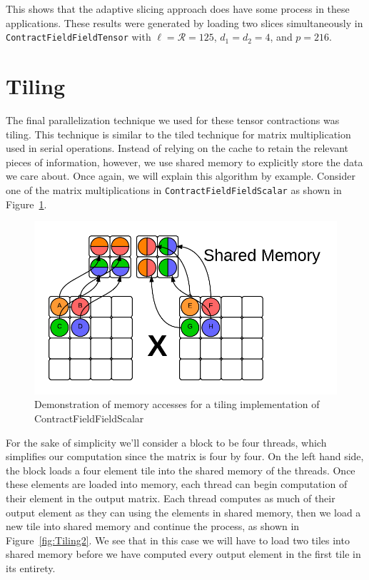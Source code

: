 This shows that the adaptive slicing approach does have some process in these applications. These results were generated by loading two slices simultaneously in \texttt{ContractFieldFieldTensor} with $\ell = \mathcal{R} = 125$, $d_1 = d_2 = 4$, and $p=216$.

\section{Tiling}\label{sec:tiling}

The final parallelization technique we used for these tensor contractions was
tiling. This technique is similar to the tiled technique for matrix
multiplication used in serial operations. Instead of relying on the cache to
retain the relevant pieces of information, however, we use shared memory to
explicitly store the data we care about. Once again, we will explain this
algorithm by example. Consider one of the matrix multiplications in
\texttt{ContractFieldFieldScalar} as shown in Figure~\ref{fig:Tiling}. 

\begin{figure}[ht]
    \centering
    \includegraphics[scale = .7]{ContractFieldFieldScalarGraphicTiling}
    \caption{Demonstration of memory accesses for a tiling implementation of ContractFieldFieldScalar}
\label{fig:Tiling}
\end{figure}

For the sake of simplicity we'll consider a block to be four threads, which
simplifies our computation since the matrix is four by four. On the left hand
side, the block loads a four element tile into the shared memory of the
threads. Once these elements are loaded into memory, each thread can begin
computation of their element in the output matrix. Each thread computes as much
of their output element as they can using the elements in shared memory, then
we load a new tile into shared memory and continue the process, as shown in Figure~\ref{fig:Tiling2}.
We see that in this case we will have to load two tiles into shared memory
before we have computed every output element in the first tile in its entirety. 

